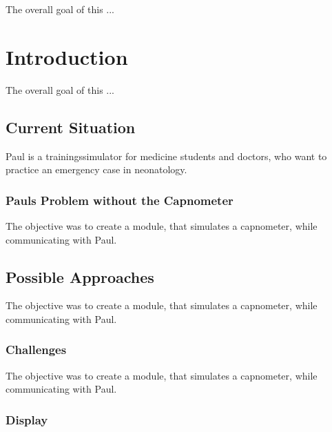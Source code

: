 \documentclass[12pt]{article}
\begin{document}
The overall goal of this ...


\clearpage




\section{Introduction}

The overall goal of this ...


\subsection{Current Situation}

Paul is a trainingssimulator for medicine students and doctors, who want to practice
an emergency case in neonatology.


\subsubsection{Pauls Problem without the Capnometer}

The objective was to create a module, that simulates a capnometer, while communicating
with Paul.


\subsection{Possible Approaches}

The objective was to create a module, that simulates a capnometer, while communicating
with Paul.


\subsubsection{Challenges}

The objective was to create a module, that simulates a capnometer, while communicating
with Paul.


\subsubsection{Display}
\end{document}
